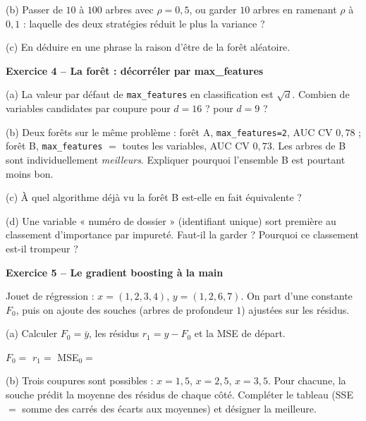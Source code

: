 \documentclass[10pt,a4paper]{article}
\newcommand{\repligne}{\par\vspace{0.42cm}\noindent\dotfill}
\newcommand{\zonecalcul}[1]{\par\vspace{0.15cm}\noindent{\small\emph{Espace de calcul :}}\par\vspace{#1}}
\begin{document}
(b) Passer de $10$ à $100$ arbres avec $\rho=0{,}5$, ou garder $10$ arbres en ramenant $\rho$ à $0{,}1$ : laquelle des deux stratégies réduit le plus la variance ?
\repligne\repligne

\vspace{0.15cm}
(c) En déduire en une phrase la raison d'être de la forêt aléatoire.
\repligne

\vspace{0.45cm}
\textbf{\large Exercice 4 -- La forêt : décorréler par max\_features}
\vspace{0.15cm}

(a) La valeur par défaut de \texttt{max\_features} en classification est $\sqrt d$. Combien de variables candidates par coupure pour $d=16$ ? pour $d=9$ ? \makebox[3.5cm]{\dotfill}

\vspace{0.15cm}
(b) Deux forêts sur le même problème : forêt A, \texttt{max\_features=2}, AUC CV $0{,}78$ ; forêt B, \texttt{max\_features} $=$ toutes les variables, AUC CV $0{,}73$. Les arbres de B sont individuellement \emph{meilleurs}. Expliquer pourquoi l'ensemble B est pourtant moins bon.
\repligne\repligne\repligne

\vspace{0.15cm}
(c) À quel algorithme déjà vu la forêt B est-elle en fait équivalente ?
\repligne

\vspace{0.15cm}
(d) Une variable « numéro de dossier » (identifiant unique) sort première au classement d'importance par impureté. Faut-il la garder ? Pourquoi ce classement est-il trompeur ?
\repligne\repligne

\vspace{0.45cm}
\textbf{\large Exercice 5 -- Le gradient boosting à la main}
\vspace{0.15cm}

Jouet de régression : $x=(1,2,3,4)$, $y=(1,2,6,7)$. On part d'une constante $F_0$, puis on ajoute des souches (arbres de profondeur $1$) ajustées sur les résidus.

\vspace{0.15cm}
(a) Calculer $F_0 = \bar y$, les résidus $r_1 = y - F_0$ et la MSE de départ.
\zonecalcul{0.9cm}
$F_0=$ \makebox[1.5cm]{\dotfill} \quad $r_1=$ \makebox[4cm]{\dotfill} \quad MSE$_0=$ \makebox[1.5cm]{\dotfill}

\vspace{0.15cm}
(b) Trois coupures sont possibles : $x=1{,}5$, $x=2{,}5$, $x=3{,}5$. Pour chacune, la souche prédit la moyenne des résidus de chaque côté. Compléter le tableau (SSE $=$ somme des carrés des écarts aux moyennes) et désigner la meilleure.
\end{document}
